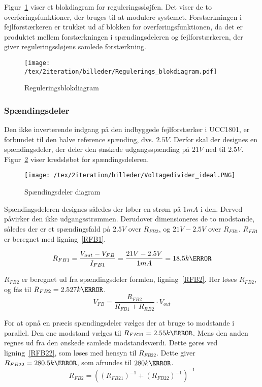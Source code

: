 Figur~\ref{fig:regulerings_blokdiagram} viser et blokdiagram for reguleringssløjfen. Det viser de to overføringsfunktioner, der bruges til at modulere systemet. Forstærkningen i fejlforstærkeren er trukket ud af blokken for overføringsfunktionen, da det er produktet mellem forstærkningen i spændingsdeleren og fejlforstærkeren, der giver reguleringssløjens samlede forstærkning. 

\begin{figure}[H]
	\center
	\texttt{[image: /tex/2iteration/billeder/Regulerings\_blokdiagram.pdf]}
	\caption{Reguleringsblokdiagram}
	\label{fig:regulerings_blokdiagram}
\end{figure}

\subsubsection{Spændingsdeler}
Den ikke inverterende indgang på den indbyggede fejlforstærker i UCC1801, er forbundet til den halve reference spænding, dvs. $2.5V$. Derfor skal der designes en spændingsdeler, der deler den ønskede udgangsspænding på $21V$ ned til $2.5V$. Figur~\ref{fig:Voltagedivider_ideal} viser kredsløbet for spændingsdeleren. 

\begin{figure}[H]
	\center
	\texttt{[image: /tex/2iteration/billeder/Voltagedivider\_ideal.PNG]}
	\caption{Spændingsdeler diagram}
	\label{fig:Voltagedivider_ideal}
\end{figure}

Spændingsdeleren designes således der løber en strøm på $1mA$ i den. Derved påvirker den ikke udgangsstrømmen. Derudover dimensioneres de to modstande, således der er et spændingsfald på $2.5V$ over $R_{FB2}$, og $21V-2.5V$ over $R_{FB1}$. $R_{FB1}$ er beregnet med ligning~\ref{RFB1}.

\begin{equation} \label{RFB1}
R_{FB1} = \frac{V_{out}-V_{FB}}{I_{FB1}} = \frac{21V-2.5V}{1mA} = 18.5k\ohm
\end{equation}

\noindent $R_{FB2}$ er beregnet ud fra spændingsdeler formlen, ligning~\ref{RFB2}. Her løses $R_{FB2}$, og fås til $R_{FB2}=2.527k \ohm$.  
\begin{equation} \label{RFB2}
V_{FB} = \frac{R_{FB2}}{R_{FB1} + R_{RB2}} \cdot V_{out}
\end{equation}

For at opnå en præcis spændingsdeler vælges der at bruge to modstande i parallel. Den ene modstand vælges til $R_{FB21}=2.55k\ohm$. Mens den anden regnes ud fra den ønskede samlede modstandsværdi. Dette gøres ved ligning~\ref{RFB22}, som løses med hensyn til $R_{FB22}$. Dette giver $R_{FB22}=280.5k\ohm$, som afrundes til $280k\ohm$.
\begin{equation} \label{RFB22}
R_{FB2} = ((R_{FB21})^{-1} + (R_{FB22})^{-1})^{-1}
\end{equation}

